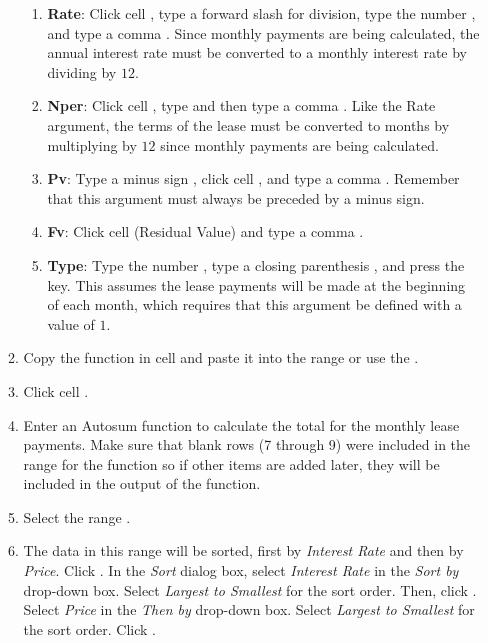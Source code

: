 \begin{enumerate}
\begin{enumerate}
		\begin{enumerate}
			\item \textbf{Rate}: Click cell , type a forward slash \fmtTyping{/} for division, type the number , and type a comma \fmtTyping{,}. Since monthly payments are being calculated, the annual interest rate must be converted to a monthly interest rate by dividing by $ 12 $.
			
			\item \textbf{Nper}: Click cell , type  and then type a comma \fmtTyping{,}. Like the Rate argument, the terms of the lease must be converted to months by multiplying by $ 12 $ since monthly payments are being calculated.
			
			\item \textbf{Pv}: Type a minus sign \fmtTyping{-}, click cell , and type a comma \fmtTyping{,}. Remember that this argument must always be preceded by a minus sign.
			
			\item \textbf{Fv}: Click cell  (Residual Value) and type a comma \fmtTyping{,}.
			
			\item \textbf{Type}: Type the number , type a closing parenthesis \fmtTyping{)}, and press the  key. This assumes the lease payments will be made at the beginning of each month, which requires that this argument be defined with a value of $ 1 $.
		\end{enumerate}
	
		\item Copy the  function in cell  and paste it into the range  or use the .
		
		\item Click cell . 
		
		\item Enter an Autosum function to calculate the total for the monthly lease payments. Make sure that blank rows (7 through 9) were included in the range for the  function so if other items are added later, they will be included in the output of the  function.
		
		\item Select the range . 
		
		\item The data in this range will be sorted, first by \textit{Interest Rate} and then by \textit{Price}. Click . In the \textit{Sort} dialog box, select \textit{Interest Rate} in the \textit{Sort by} drop-down box. Select \textit{Largest to Smallest} for the sort order. Then, click . Select \textit{Price} in the \textit{Then by} drop-down box. Select \textit{Largest to Smallest} for the sort order. Click .
	

\end{enumerate}
\end{enumerate}
